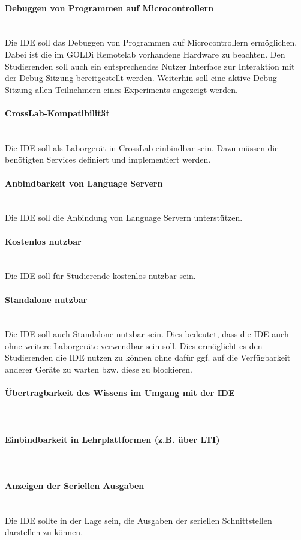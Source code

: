 \paragraph{Debuggen von Programmen auf Microcontrollern} \mbox{} \\
Die IDE soll das Debuggen von Programmen auf Microcontrollern ermöglichen. Dabei ist die im GOLDi Remotelab vorhandene Hardware zu beachten. Den Studierenden soll auch ein entsprechendes Nutzer Interface zur Interaktion mit der Debug Sitzung bereitgestellt werden. Weiterhin soll eine aktive Debug-Sitzung allen Teilnehmern eines Experiments angezeigt werden.

\paragraph{CrossLab-Kompatibilität} \mbox{} \\
Die IDE soll als Laborgerät in CrossLab einbindbar sein. Dazu müssen die benötigten Services definiert und implementiert werden.

\paragraph{Anbindbarkeit von Language Servern} \mbox{} \\
Die IDE soll die Anbindung von Language Servern unterstützen.

\paragraph{Kostenlos nutzbar} \mbox{} \\
Die IDE soll für Studierende kostenlos nutzbar sein.

\paragraph{Standalone nutzbar} \mbox{} \\
Die IDE soll auch Standalone nutzbar sein. Dies bedeutet, dass die IDE auch ohne weitere Laborgeräte verwendbar sein soll. Dies ermöglicht es den Studierenden die IDE nutzen zu können ohne dafür ggf. auf die Verfügbarkeit anderer Geräte zu warten bzw. diese zu blockieren.

\paragraph{Übertragbarkeit des Wissens im Umgang mit der IDE} \mbox{} \\


\paragraph{Einbindbarkeit in Lehrplattformen (z.B. über LTI)} \mbox{} \\


\paragraph{Anzeigen der Seriellen Ausgaben} \mbox{} \\
Die IDE sollte in der Lage sein, die Ausgaben der seriellen Schnittstellen darstellen zu können.